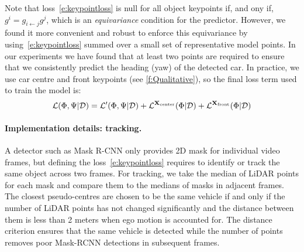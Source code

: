 Note that loss~\eqref{e:keypointloss} is null for all object keypoints if, and ony if, $g^i = g_{i\leftarrow j}g^j$, which is an \emph{equivariance} condition for the predictor.
However, we found it more convenient and robust to enforce this equivariance by using~\cref{e:keypointloss} summed over a small set of representative model points.
In our experiments we have found that at least two points are required to ensure that we consistently predict the heading (yaw) of the detected car.
In practice, we use car centre and front keypoints (see \cref{f:Qualitative}), so the final loss term used to train the model is:
\begin{equation}\label{e:finalloss}
\mathcal{L}(\Phi, \Psi|\mathcal{D}) =
\mathcal{L}'(\Phi,\Psi|\mathcal{D})
+ \mathcal{L}^{\mathbf{X}_\text{center}}(\Phi|\mathcal{D})
+ \mathcal{L}^{\mathbf{X}_\text{front}}(\Phi|\mathcal{D})
\end{equation}

\paragraph{Implementation details: tracking.}

A detector such as Mask R-CNN only provides 2D mask for individual video frames, but defining the loss~\eqref{e:keypointloss} requires to identify or track the same object across two frames.
For tracking, we take the median of LiDAR points for each mask and compare them to the medians of masks in adjacent frames.
The closest pseudo-centres are chosen to be the same vehicle if and only if the number of LiDAR points has not changed significantly and the distance between them is less than 2 meters when ego motion is accounted for.
The distance criterion ensures that the same vehicle is detected while the number of points removes poor Mask-RCNN detections in subsequent frames.

